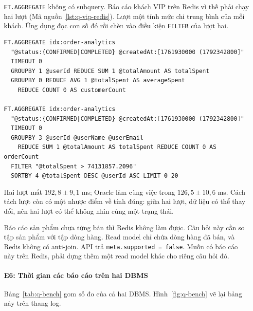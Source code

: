 \texttt{FT.AGGREGATE} không có subquery. Báo cáo khách VIP trên Redis vì thế phải chạy hai lượt (Mã nguồn~\ref{lst:q-vip-redis}). Lượt một tính mức chi trung bình của mỗi khách. Ứng dụng đọc con số đó rồi chèn vào điều kiện \texttt{FILTER} của lượt hai.

\reportblockspace{72pt}
\begin{lstlisting}[language=Redis,caption={Khách VIP trên Redis: hai lượt FT.AGGREGATE, giá trị trung bình do ứng dụng chuyển từ lượt một sang lượt hai.},label={lst:q-vip-redis}]
FT.AGGREGATE idx:order-analytics
  "@status:{CONFIRMED|COMPLETED} @createdAt:[1761930000 (1792342800]"
  TIMEOUT 0
  GROUPBY 1 @userId REDUCE SUM 1 @totalAmount AS totalSpent
  GROUPBY 0 REDUCE AVG 1 @totalSpent AS averageSpent
    REDUCE COUNT 0 AS customerCount

FT.AGGREGATE idx:order-analytics
  "@status:{CONFIRMED|COMPLETED} @createdAt:[1761930000 (1792342800]"
  TIMEOUT 0
  GROUPBY 3 @userId @userName @userEmail
    REDUCE SUM 1 @totalAmount AS totalSpent REDUCE COUNT 0 AS orderCount
  FILTER "@totalSpent > 74131857.2096"
  SORTBY 4 @totalSpent DESC @userId ASC LIMIT 0 20
\end{lstlisting}

Hai lượt mất $192{,}8 \pm 9{,}1$ ms; Oracle làm cùng việc trong $126{,}5 \pm 10{,}6$ ms. Cách tách lượt còn có một nhược điểm về tính đúng: giữa hai lượt, dữ liệu có thể thay đổi, nên hai lượt có thể không nhìn cùng một trạng thái.

Báo cáo sản phẩm chưa từng bán thì Redis không làm được. Câu hỏi này cần so tập sản phẩm với tập dòng hàng. Read model chỉ chứa dòng hàng đã bán, và Redis không có anti-join. API trả \texttt{meta.supported = false}. Muốn có báo cáo này trên Redis, phải dựng thêm một read model khác cho riêng câu hỏi đó.

\paragraph{E6: Thời gian các báo cáo trên hai DBMS}\label{sec:q-e6}

Bảng~\ref{tab:q-bench} gom số đo của cả hai DBMS. Hình~\ref{fig:q-bench} vẽ lại bảng này trên thang log.

